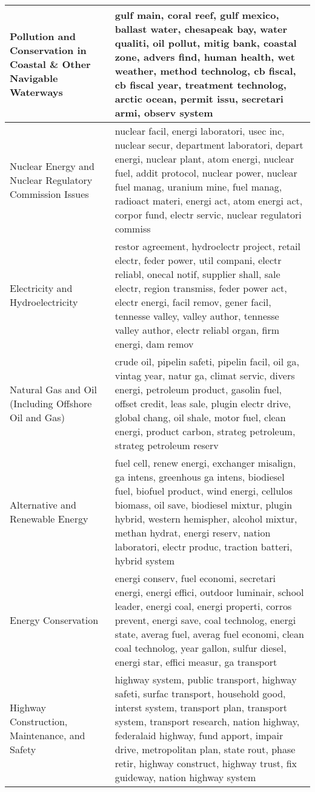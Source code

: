 \begin{longtable}{p{}p{}}
   \hline
Pollution and Conservation in Coastal \& Other Navigable Waterways & gulf main, coral reef, gulf mexico, ballast water, chesapeak bay, water qualiti, oil pollut, mitig bank, coastal zone, advers find, human health, wet weather, method technolog, cb fiscal, cb fiscal year, treatment technolog, arctic ocean, permit issu, secretari armi, observ system \\ 
   \hline
Nuclear Energy and Nuclear Regulatory Commission Issues & nuclear facil, energi laboratori, usec inc, nuclear secur, department laboratori, depart energi, nuclear plant, atom energi, nuclear fuel, addit protocol, nuclear power, nuclear fuel manag, uranium mine, fuel manag, radioact materi, energi act, atom energi act, corpor fund, electr servic, nuclear regulatori commiss \\ 
   \hline
Electricity and Hydroelectricity & restor agreement, hydroelectr project, retail electr, feder power, util compani, electr reliabl, onecal notif, supplier shall, sale electr, region transmiss, feder power act, electr energi, facil remov, gener facil, tennesse valley, valley author, tennesse valley author, electr reliabl organ, firm energi, dam remov \\ 
   \hline
Natural Gas and Oil (Including Offshore Oil and Gas) & crude oil, pipelin safeti, pipelin facil, oil ga, vintag year, natur ga, climat servic, divers energi, petroleum product, gasolin fuel, offset credit, leas sale, plugin electr drive, global chang, oil shale, motor fuel, clean energi, product carbon, strateg petroleum, strateg petroleum reserv \\ 
   \hline
Alternative and Renewable Energy & fuel cell, renew energi, exchanger misalign, ga intens, greenhous ga intens, biodiesel fuel, biofuel product, wind energi, cellulos biomass, oil save, biodiesel mixtur, plugin hybrid, western hemispher, alcohol mixtur, methan hydrat, energi reserv, nation laboratori, electr produc, traction batteri, hybrid system \\ 
   \hline
Energy Conservation & energi conserv, fuel economi, secretari energi, energi effici, outdoor luminair, school leader, energi coal, energi properti, corros prevent, energi save, coal technolog, energi state, averag fuel, averag fuel economi, clean coal technolog, year gallon, sulfur diesel, energi star, effici measur, ga transport \\ 
   \hline
Highway Construction, Maintenance, and Safety & highway system, public transport, highway safeti, surfac transport, household good, interst system, transport plan, transport system, transport research, nation highway, federalaid highway, fund apport, impair drive, metropolitan plan, state rout, phase retir, highway construct, highway trust, fix guideway, nation highway system \\ 

\end{longtable}
